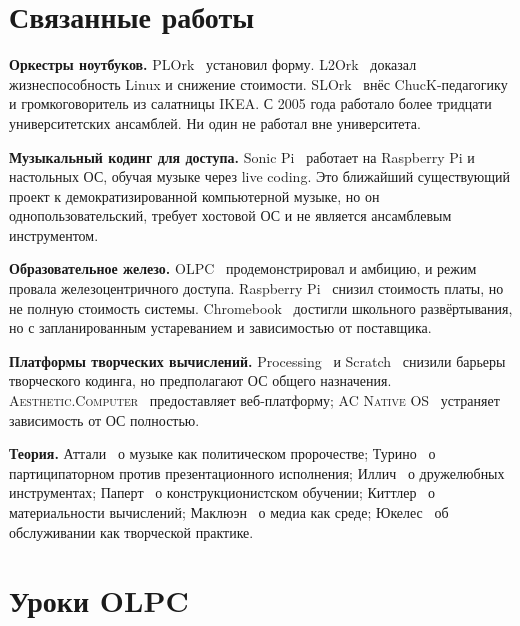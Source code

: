 \documentclass[10pt,letterpaper,twocolumn]{article}
\newcommand{\ac}{\textsc{Aesthetic.Computer}}
\newcommand{\acos}{\textsc{AC Native OS}}
\begin{document}

\section{Связанные работы}
\label{sec:related}

\textbf{Оркестры ноутбуков.} PLOrk~\citep{trueman2006plork} установил форму. L2Ork~\citep{bukvic2010l2ork} доказал жизнеспособность Linux и снижение стоимости. SLOrk~\citep{wang2009designing} внёс ChucK-педагогику и громкоговоритель из салатницы IKEA. С 2005 года работало более тридцати университетских ансамблей. Ни один не работал вне университета.

\textbf{Музыкальный кодинг для доступа.} Sonic Pi~\citep{aaron2016sonic} работает на Raspberry Pi и настольных ОС, обучая музыке через live coding. Это ближайший существующий проект к демократизированной компьютерной музыке, но он однопользовательский, требует хостовой ОС и не является ансамблевым инструментом.

\textbf{Образовательное железо.} OLPC~\citep{negroponte1995being, kraemer2009olpc} продемонстрировал и амбицию, и режим провала железоцентричного доступа. Raspberry Pi~\citep{raspberry2012} снизил стоимость платы, но не полную стоимость системы. Chromebook~\citep{pirg2023chromebook} достигли школьного развёртывания, но с запланированным устареванием и зависимостью от поставщика.

\textbf{Платформы творческих вычислений.} Processing~\citep{reas2007processing} и Scratch~\citep{resnick2009scratch} снизили барьеры творческого кодинга, но предполагают ОС общего назначения. \ac{}~\citep{scudder2026ac} предоставляет веб-платформу; \acos{}~\citep{scudder2026os} устраняет зависимость от ОС полностью.

\textbf{Теория.} Аттали~\citep{attali1985noise} о музыке как политическом пророчестве; Турино~\citep{turino2008music} о партиципаторном против презентационного исполнения; Иллич~\citep{illich1973tools} о дружелюбных инструментах; Паперт~\citep{papert1980mindstorms} о конструкционистском обучении; Киттлер~\citep{kittler1995no} о материальности вычислений; Маклюэн~\citep{mcluhan1964understanding} о медиа как среде; Юкелес~\citep{ukeles1969manifesto} об обслуживании как творческой практике.


\section{Уроки OLPC}
\label{sec:olpc}
\end{document}
